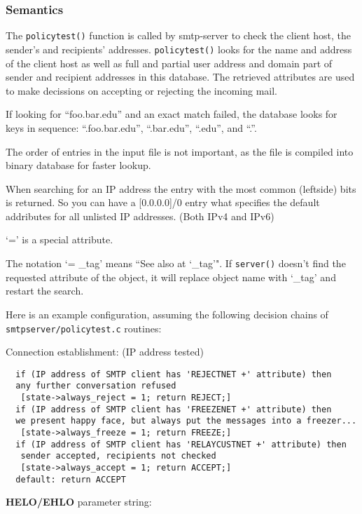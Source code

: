 \subsubsection{Semantics}



The {\tt policytest()} function is called by smtp-server to check the client 
host, the sender's and recipients' addresses.  {\tt policytest()} looks for 
the name and address of the client host as well as full and partial user address 
and domain part of sender and recipient addresses in this database.  The 
retrieved attributes are used to make decissions on accepting or rejecting 
the incoming mail.

If looking for ``foo.bar.edu'' and an exact match failed, the database looks
for keys in sequence:  ``.foo.bar.edu'', ``.bar.edu'', ``.edu'', and ``.''.

The order of entries in the input file is not important, as the file is
compiled into binary database for faster lookup.

When searching for an IP address the entry with the most common (leftside)
bits is returned.   So you can have a [0.0.0.0]/0 entry what specifies the 
default addributes for all unlisted IP addresses. (Both IPv4 and IPv6)

`=' is a special attribute.

The notation `= \_tag' means ``See also at `\_tag'". If {\tt server()} doesn't 
find the requested attribute of the object, it will replace object name 
with `\_tag' and restart the search.

Here is an example configuration, assuming the following decision 
chains of {\tt smtpserver/policytest.c} routines:

Connection establishment:  (IP address tested)

\begin{verbatim}
  if (IP address of SMTP client has 'REJECTNET +' attribute) then
  any further conversation refused
   [state->always_reject = 1; return REJECT;]
  if (IP address of SMTP client has 'FREEZENET +' attribute) then
  we present happy face, but always put the messages into a freezer...
   [state->always_freeze = 1; return FREEZE;]
  if (IP address of SMTP client has 'RELAYCUSTNET +' attribute) then
   sender accepted, recipients not checked
   [state->always_accept = 1; return ACCEPT;]
  default: return ACCEPT
\end{verbatim}


{\bf HELO/EHLO} parameter string:

